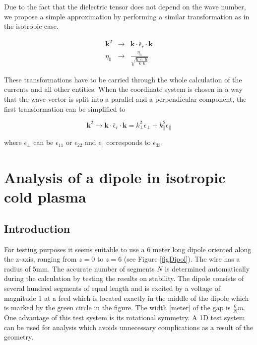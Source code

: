 \documentclass[a4paper,11pt]{article}
\begin{document}
Due to the fact that the dielectric tensor does not depend on the wave number, we propose a simple approximation by performing a similar transformation as in the isotropic case.

\begin{eqnarray}
 \mathbf{k}^2 &\rightarrow& \mathbf{k}\cdot \bar{\epsilon}_r \cdot \mathbf{k}\\
\eta_0 &\rightarrow& \frac{\eta_0}{\sqrt{\frac{\mathbf{k}\cdot \bar{\epsilon}_r \cdot \mathbf{k}}{\mathbf{k} \cdot \mathbf{k}}}}
\end{eqnarray}

These transformations have to be carried through the whole calculation of the currents and all other entities. When the coordinate system is chosen in a way that the wave-vector is split into a parallel and a perpendicular component, the first transformation can be simplified to

\begin{equation}
 \mathbf{k}^2 \rightarrow \mathbf{k}\cdot \bar{\epsilon}_r \cdot \mathbf{k}=k_\bot^2 \epsilon_{\bot} + k_\|^2 \epsilon_{\|}
\end{equation}

where $\epsilon_{\bot}$ can be $\epsilon_{11}$ or $\epsilon_{22}$ and $\epsilon_{\|}$ corresponds to $\epsilon_{33}$.

\section{Analysis of a dipole in isotropic cold plasma}
\subsection{Introduction}
For testing purposes it seems suitable to use a 6 meter long dipole oriented along the z-axis, ranging from $z=0$ to $z=6$ (see Figure \ref{figDipol}). The wire has a radius of 5mm. The accurate number of segments $N$ is determined automatically during the calculation by testing the results on stability. The dipole consists of several hundred segments of equal length and is excited by a voltage of magnitude 1 at a feed which is located exactly in the middle of the dipole which is marked by the green circle in the figure. The width [meter] of the gap is $\frac{6}{N}m$. One advantage of this test system is its rotational symmetry. A 1D test system can be used for analysis which avoids unnecessary complications as a result of the geometry.\\
\end{document}
